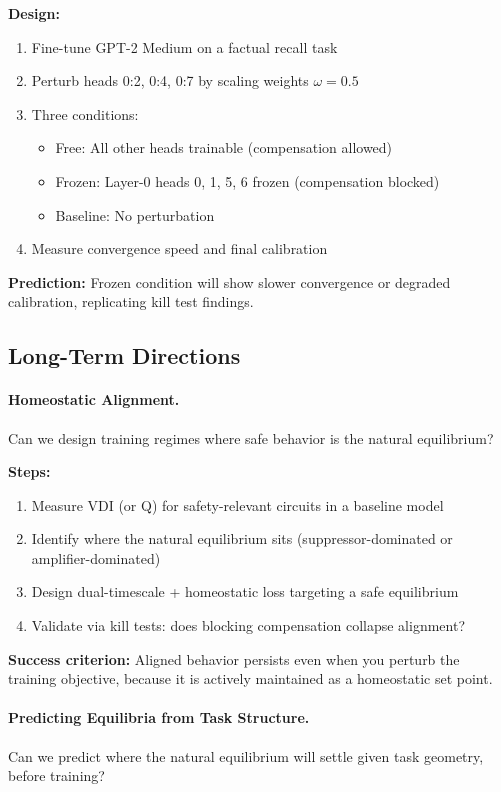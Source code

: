 \textbf{Design:}
\begin{enumerate}
\item Fine-tune GPT-2 Medium on a factual recall task
\item Perturb heads 0:2, 0:4, 0:7 by scaling weights $\omega = 0.5$
\item Three conditions:
  \begin{itemize}
  \item Free: All other heads trainable (compensation allowed)
  \item Frozen: Layer-0 heads 0, 1, 5, 6 frozen (compensation blocked)
  \item Baseline: No perturbation
  \end{itemize}
\item Measure convergence speed and final calibration
\end{enumerate}

\textbf{Prediction:} Frozen condition will show slower convergence or degraded calibration, replicating kill test findings.

\subsection{Long-Term Directions}

\paragraph{Homeostatic Alignment.}
Can we design training regimes where safe behavior is the natural equilibrium?

\textbf{Steps:}
\begin{enumerate}
\item Measure VDI (or Q) for safety-relevant circuits in a baseline model
\item Identify where the natural equilibrium sits (suppressor-dominated or amplifier-dominated)
\item Design dual-timescale + homeostatic loss targeting a safe equilibrium
\item Validate via kill tests: does blocking compensation collapse alignment?
\end{enumerate}

\textbf{Success criterion:} Aligned behavior persists even when you perturb the training objective, because it is actively maintained as a homeostatic set point.

\paragraph{Predicting Equilibria from Task Structure.}
Can we predict where the natural equilibrium will settle given task geometry, before training?

